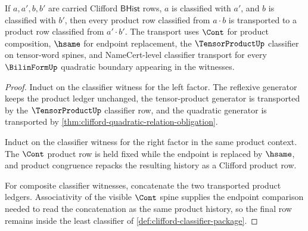 \begin{theorem}
\label{thm:clifford-product-stability-obligation}
If $a,a',b,b'$ are carried Clifford $\mathsf{BHist}$ rows, $a$ is classified with $a'$, and $b$ is classified with $b'$, then every product row classified from $a \cdot b$ is transported to a product row classified from $a' \cdot b'$. The transport uses $\Cont$ for product composition, $\hsame$ for endpoint replacement, the $\TensorProductUp$ classifier on tensor-word spines, and NameCert-level classifier transport for every $\BilinFormUp$ quadratic boundary appearing in the witnesses.
\end{theorem}
\begin{proof}
Induct on the classifier witness for the left factor. The reflexive generator keeps the product ledger unchanged, the tensor-product generator is transported by the $\TensorProductUp$ classifier row, and the quadratic generator is transported by \autoref{thm:clifford-quadratic-relation-obligation}.

Induct on the classifier witness for the right factor in the same product context. The $\Cont$ product row is held fixed while the endpoint is replaced by $\hsame$, and product congruence repacks the resulting history as a Clifford product row.

For composite classifier witnesses, concatenate the two transported product ledgers. Associativity of the visible $\Cont$ spine supplies the endpoint comparison needed to read the concatenation as the same product history, so the final row remains inside the least classifier of \autoref{def:clifford-classifier-package}.
\end{proof}

